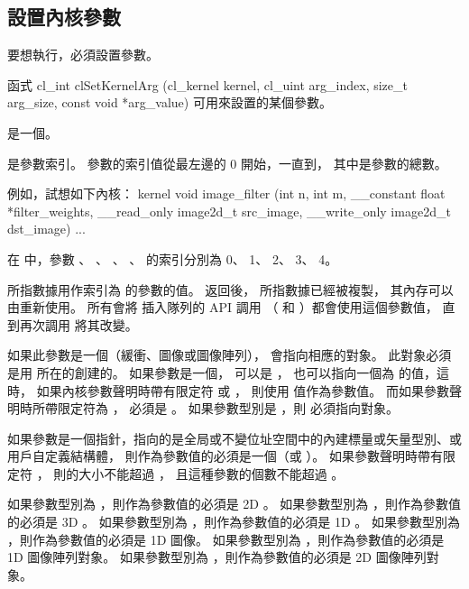 \subsection{設置內核參數}

要想執行，必須設置參數。

函式
\startclc
cl_int clSetKernelArg (cl_kernel kernel,
			cl_uint arg_index,
			size_t arg_size,
			const void *arg_value)
\stopclc
可用來設置的某個參數。

 是一個。

 是參數索引。
參數的索引值從最左邊的 0 開始，一直到，
其中是參數的總數。

例如，試想如下內核：
\startclc
kernel void
image_filter (int n, int m,
		__constant float *filter_weights,
		__read_only image2d_t src_image,
		__write_only image2d_t dst_image)
{
	...
}
\stopclc

在  中，參數 、 、 、
 、  的索引分別為 0、 1、 2、 3、 4。

 所指數據用作索引為  的參數的值。
 返回後，  所指數據已經被複製，
其內存可以由重新使用。
所有會將  插入隊列的 API 調用
（  和 ）都會使用這個參數值，
直到再次調用  將其改變。

如果此參數是一個（緩衝、圖像或圖像陣列），
  會指向相應的對象。
此對象必須是用  所在的創建的。
如果參數是一個，  可以是 ，
也可以指向一個為  的值，這時，
如果內核參數聲明時帶有限定符  或 ，
則使用  值作為參數值。
而如果參數聲明時所帶限定符為 ，  必須是 。
如果參數型別是 ，則  必須指向對象。

如果參數是一個指針，指向的是全局或不變位址空間中的內建標量或矢量型別、或用戶自定義結構體，
則作為參數值的必須是一個（或 ）。
如果參數聲明時帶有限定符 ，
則的大小不能超過 ，
且這種參數的個數不能超過 。

如果參數型別為 ，則作為參數值的必須是 2D 。
如果參數型別為 ，則作為參數值的必須是 3D 。
如果參數型別為 ，則作為參數值的必須是 1D 。
如果參數型別為 ，則作為參數值的必須是 1D 圖像。
如果參數型別為 ，則作為參數值的必須是 1D 圖像陣列對象。
如果參數型別為 ，則作為參數值的必須是 2D 圖像陣列對象。

